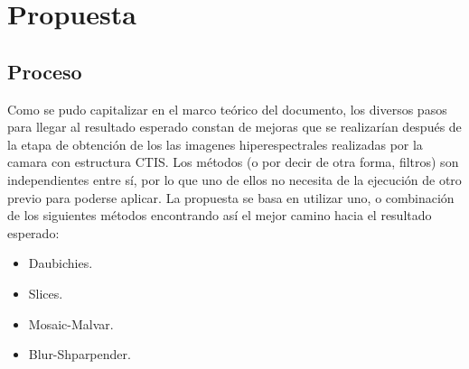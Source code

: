 \chapter{Propuesta} %
\label{Capitulo3} %

\section{Proceso}
Como se pudo capitalizar en el marco teórico del documento, los diversos pasos para llegar al resultado esperado constan de mejoras que se realizarían después de la etapa de obtención de los las imagenes hiperespectrales realizadas por la camara con estructura CTIS. Los métodos (o por decir de otra forma, filtros) son independientes entre sí, por lo que uno de ellos no necesita de la ejecución de otro previo para poderse aplicar. 
La propuesta se basa en utilizar uno, o combinación de los siguientes métodos encontrando así el mejor camino hacia el resultado esperado:

\begin{itemize}
\item Daubichies.
\item Slices.
\item Mosaic-Malvar.
\item Blur-Shparpender.
\end{itemize}

